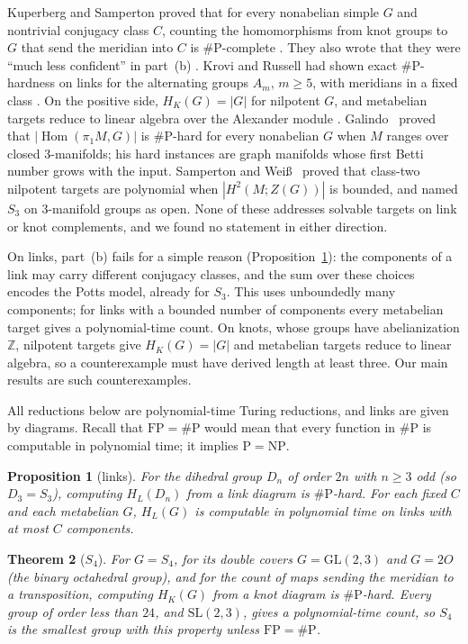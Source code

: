 \documentclass[11pt]{article}
\newtheorem{theorem}{Theorem}
\newtheorem{proposition}[theorem]{Proposition}
\theoremstyle{definition}
\theoremstyle{remark}
\newcommand{\Z}{\mathbb{Z}}
\newcommand{\Hom}{\operatorname{Hom}}
\newcommand{\sharpP}{\#\mathrm{P}}
\newcommand{\FP}{\mathrm{FP}}
\begin{document}
Kuperberg and Samperton proved that for every nonabelian simple $G$ and
nontrivial conjugacy class $C$, counting the homomorphisms from knot groups to
$G$ that send the meridian into $C$ is $\sharpP$-complete \cite{KS21}. They also wrote that they were ``much less
confident'' in part~(b) \cite[\S5.3]{KS18}. Krovi and Russell had shown exact
$\sharpP$-hardness on links for the alternating groups $A_m$, $m\ge5$, with
meridians in a fixed class \cite{KR15}. On the
positive side, $H_K(G)=|G|$ for nilpotent $G$, and metabelian targets reduce
to linear algebra over the Alexander module \cite[\S1]{KS21}.
Galindo~\cite{Gal26} proved that $|\Hom(\pi_1M,G)|$ is $\sharpP$-hard for
every nonabelian $G$ when $M$ ranges over closed 3-manifolds; his hard
instances are graph manifolds whose first Betti number grows with the input.
Samperton and Wei\ss~\cite{SW26} proved that class-two nilpotent targets are
polynomial when $|H^2(M;Z(G))|$ is bounded, and named $S_3$ on 3-manifold groups
as open. None of these addresses solvable targets on link or knot complements,
and we found no statement in either direction.

On links, part~(b) fails for a simple reason (Proposition~\ref{prop:links}): the
components of a link may carry different conjugacy classes, and the sum over
these choices encodes the Potts model, already for $S_3$. This uses unboundedly
many components; for links with a bounded number of components every
metabelian target gives a polynomial-time count. On knots, whose groups have
abelianization $\Z$, nilpotent targets give $H_K(G)=|G|$ and metabelian
targets reduce to linear algebra, so a counterexample must have derived length
at least three. Our main results are such counterexamples.

All reductions below are polynomial-time Turing reductions, and links are
given by diagrams. Recall that $\FP=\sharpP$ would mean that every function
in $\sharpP$ is computable in polynomial time; it implies $\mathrm{P}=
\mathrm{NP}$.

\begin{proposition}[links]\label{prop:links}
For the dihedral group $D_n$ of order $2n$ with $n\ge3$ odd (so $D_3=S_3$),
computing $H_L(D_n)$ from a link diagram is $\sharpP$-hard. For each fixed $C$
and each metabelian $G$, $H_L(G)$ is computable in polynomial time on links with
at most $C$ components.
\end{proposition}

\begin{theorem}[$S_4$]\label{thm:s4}
For $G=S_4$, for its double covers $G=\mathrm{GL}(2,3)$ and $G=2O$ (the binary
octahedral group), and for the count of maps sending the meridian to a
transposition, computing $H_K(G)$ from a knot diagram is $\sharpP$-hard.
Every group of order less than $24$, and $\mathrm{SL}(2,3)$, gives a
polynomial-time count, so $S_4$ is the smallest group with this property
unless $\FP=\sharpP$.
\end{theorem}
\end{document}
